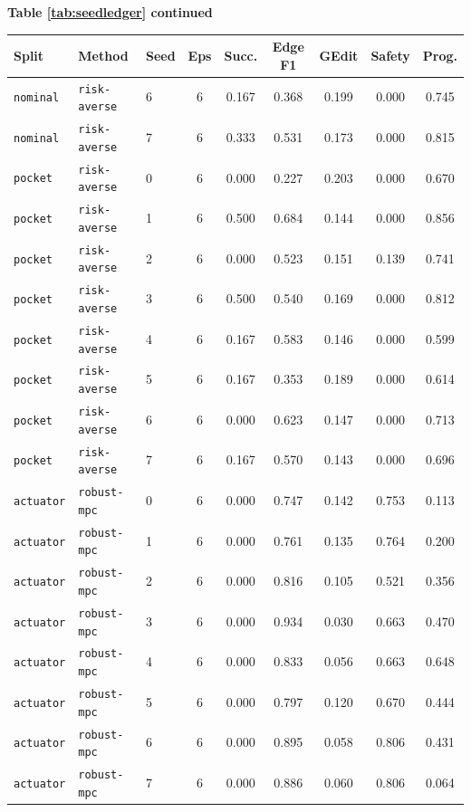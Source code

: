 \documentclass{article}
\begin{document}
\begin{center}
\textbf{Table \ref{tab:seedledger} continued}\\[0.4ex]
\begin{tabular}{lllcccccc}
\toprule
Split & Method & Seed & Eps & Succ. & Edge F1 & GEdit & Safety & Prog. \\
\midrule
\texttt{nominal} & \texttt{risk-averse} & 6 & 6 & 0.167 & 0.368 & 0.199 & 0.000 & 0.745 \\
\texttt{nominal} & \texttt{risk-averse} & 7 & 6 & 0.333 & 0.531 & 0.173 & 0.000 & 0.815 \\
\texttt{pocket} & \texttt{risk-averse} & 0 & 6 & 0.000 & 0.227 & 0.203 & 0.000 & 0.670 \\
\texttt{pocket} & \texttt{risk-averse} & 1 & 6 & 0.500 & 0.684 & 0.144 & 0.000 & 0.856 \\
\texttt{pocket} & \texttt{risk-averse} & 2 & 6 & 0.000 & 0.523 & 0.151 & 0.139 & 0.741 \\
\texttt{pocket} & \texttt{risk-averse} & 3 & 6 & 0.500 & 0.540 & 0.169 & 0.000 & 0.812 \\
\texttt{pocket} & \texttt{risk-averse} & 4 & 6 & 0.167 & 0.583 & 0.146 & 0.000 & 0.599 \\
\texttt{pocket} & \texttt{risk-averse} & 5 & 6 & 0.167 & 0.353 & 0.189 & 0.000 & 0.614 \\
\texttt{pocket} & \texttt{risk-averse} & 6 & 6 & 0.000 & 0.623 & 0.147 & 0.000 & 0.713 \\
\texttt{pocket} & \texttt{risk-averse} & 7 & 6 & 0.167 & 0.570 & 0.143 & 0.000 & 0.696 \\
\texttt{actuator} & \texttt{robust-mpc} & 0 & 6 & 0.000 & 0.747 & 0.142 & 0.753 & 0.113 \\
\texttt{actuator} & \texttt{robust-mpc} & 1 & 6 & 0.000 & 0.761 & 0.135 & 0.764 & 0.200 \\
\texttt{actuator} & \texttt{robust-mpc} & 2 & 6 & 0.000 & 0.816 & 0.105 & 0.521 & 0.356 \\
\texttt{actuator} & \texttt{robust-mpc} & 3 & 6 & 0.000 & 0.934 & 0.030 & 0.663 & 0.470 \\
\texttt{actuator} & \texttt{robust-mpc} & 4 & 6 & 0.000 & 0.833 & 0.056 & 0.663 & 0.648 \\
\texttt{actuator} & \texttt{robust-mpc} & 5 & 6 & 0.000 & 0.797 & 0.120 & 0.670 & 0.444 \\
\texttt{actuator} & \texttt{robust-mpc} & 6 & 6 & 0.000 & 0.895 & 0.058 & 0.806 & 0.431 \\
\texttt{actuator} & \texttt{robust-mpc} & 7 & 6 & 0.000 & 0.886 & 0.060 & 0.806 & 0.064 \\

\end{tabular}
\end{center}
\end{document}
